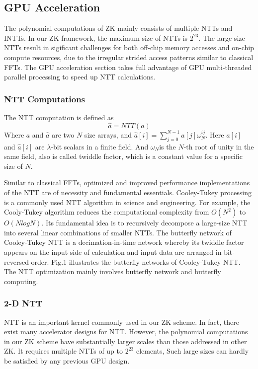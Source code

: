\subsection{GPU Acceleration}\label{section: gpu-acceleration}
The polynomial computations of ZK mainly consists of multiple NTTs and INTTs. In our ZK framework, the maximum size of NTTs is $2^{23}$. The large-size NTTs result in sigificant challenges for both off-chip memory accesses and on-chip compute resources, due to the irregular strided access patterns similar to classical FFTs. The GPU acceleration section takes full advantage of GPU multi-threaded parallel processing to speed up NTT calculations.
\subsubsection{NTT Computations}
The NTT computation is defined as
\[\hat{a} = NTT{(a)}\]
Where $a$ and  $\hat{a}$ are two $N$ size arrays, and  $\hat{a}[i] = \sum_{j=0}^{N-1} a[j] \omega_N^{ij}$. Here $a[i]$ and $\hat{a}[i]$ are $\lambda$-bit scalars in a finite field. And $\omega_N$is the $N$-th root of unity in the same field, also is called twiddle factor, which is a constant value for a specific size of $N$.

Similar to classical FFTs, optimized and improved performance implementations of the NTT are of necessity and fundamental essentials. Cooley-Tukey processing is a commonly used NTT algorithm in science and engineering. For example, the Cooly-Tukey algorithm reduces the computational complexity from $O(N^2)$ to $O(NlogN)$. Its fundamental idea is to recursively decompose a large-size NTT into several linear combinations of smaller NTTs. The butterfly network of Cooley-Tukey NTT is a decimation-in-time network whereby its twiddle factor appears on the input side of calculation and input data are arranged in bit-reversed order. Fig.1 illustrates the butterfly networks of Cooley-Tukey NTT. The NTT optimization mainly involves butterfly network and butterfly computing.
\subsubsection{2-D NTT}
NTT is an important kernel commonly used in our ZK scheme. In fact, there exist many accelerator designs for NTT. However, the polynomial computations in our ZK scheme have substantially larger scales than those addressed in other ZK. It requires multiple NTTs of up to $2^{23}$ elements, Such large sizes can hardly be satisfied by any previous GPU design.

